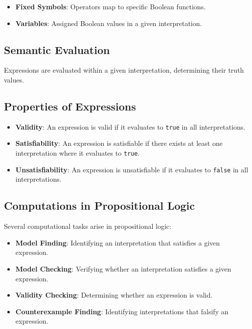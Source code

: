 \documentclass{book}
\providecommand{\tightlist}{%
  \setlength{\itemsep}{0pt}\setlength{\parskip}{0pt}}
\begin{document}
\begin{itemize}
\tightlist
\item
  \textbf{Fixed Symbols}: Operators map to specific Boolean functions.
\item
  \textbf{Variables}: Assigned Boolean values in a given interpretation.
\end{itemize}

\hypertarget{pandoc.profile.debug__pandoc__debug__src__languages.md__semantic-evaluation}{%
\subsection*{Semantic Evaluation}\label{pandoc.profile.debug__pandoc__debug__src__languages.md__semantic-evaluation}}

Expressions are evaluated within a given interpretation, determining their truth values.

\hypertarget{pandoc.profile.debug__pandoc__debug__src__languages.md__properties-of-expressions}{%
\subsection*{Properties of Expressions}\label{pandoc.profile.debug__pandoc__debug__src__languages.md__properties-of-expressions}}

\begin{itemize}
\tightlist
\item
  \textbf{Validity}: An expression is valid if it evaluates to \texttt{true} in all interpretations.
\item
  \textbf{Satisfiability}: An expression is satisfiable if there exists at least one interpretation where it evaluates to \texttt{true}.
\item
  \textbf{Unsatisfiability}: An expression is unsatisfiable if it evaluates to \texttt{false} in all interpretations.
\end{itemize}

\hypertarget{pandoc.profile.debug__pandoc__debug__src__languages.md__computations-in-propositional-logic}{%
\subsection*{Computations in Propositional Logic}\label{pandoc.profile.debug__pandoc__debug__src__languages.md__computations-in-propositional-logic}}

Several computational tasks arise in propositional logic:

\begin{itemize}
\tightlist
\item
  \textbf{Model Finding}: Identifying an interpretation that satisfies a given expression.
\item
  \textbf{Model Checking}: Verifying whether an interpretation satisfies a given expression.
\item
  \textbf{Validity Checking}: Determining whether an expression is valid.
\item
  \textbf{Counterexample Finding}: Identifying interpretations that falsify an expression.
\end{itemize}
\end{document}
